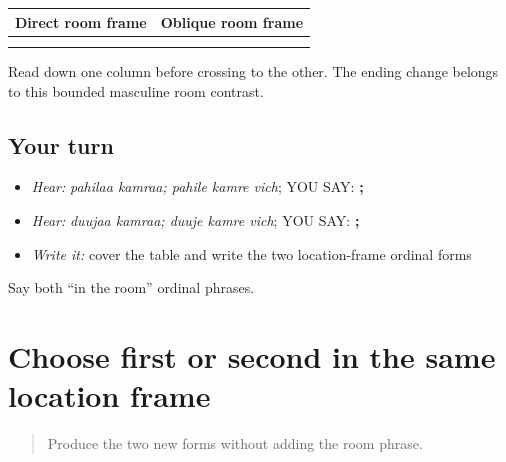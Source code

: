 \begin{grammarlens}[title={Grammar Lens}]
\noindent
\begin{tabularx}{\linewidth}{@{}>{\raggedright\arraybackslash}X>{\raggedright\arraybackslash}X@{}}
\toprule
\textbf{Direct room frame} & \textbf{Oblique room frame} \\
\midrule
\textbf{\pa{ਪਹਿਲਾ} \pa{ਕਮਰਾ}} & \textbf{\pa{ਪਹਿਲੇ} \pa{ਕਮਰੇ} \pa{ਵਿੱਚ}} \\
\textbf{\pa{ਦੂਜਾ} \pa{ਕਮਰਾ}} & \textbf{\pa{ਦੂਜੇ} \pa{ਕਮਰੇ} \pa{ਵਿੱਚ}} \\
\bottomrule
\end{tabularx}

Read down one column before crossing to the other. The ending change belongs to this bounded masculine room contrast.
\end{grammarlens}

\subsection*{Your turn}
\begin{itemize}
\raggedright
  \item \emph{Hear:} \emph{pahilaa kamraa; pahile kamre vich}; YOU SAY: \textbf{ ;   }
  \item \emph{Hear:} \emph{duujaa kamraa; duuje kamre vich}; YOU SAY: \textbf{ ;   }
  \item \emph{Write it:} cover the table and write the two location-frame ordinal forms
\end{itemize}

\begin{tcolorbox}[breakable,colback=teal!4,colframe=teal!35!black,title={Before you move on}]
Say both “in the room” ordinal phrases.
\end{tcolorbox}
\section[\texorpdfstring{\pa{ਪਹਿਲੇ} \pa{ਕਮਰੇ} \pa{ਵਿੱਚ} … (pahile kamre …)}{ਪਹਿਲੇ ਕਮਰੇ ਵਿੱਚ … (pahile kamre …)}]{Choose first or second in the same location frame}

\label{lesson:PA-C193-ordinal-frames}



\begin{quote}
Produce the two new forms without adding the room phrase.
\end{quote}

